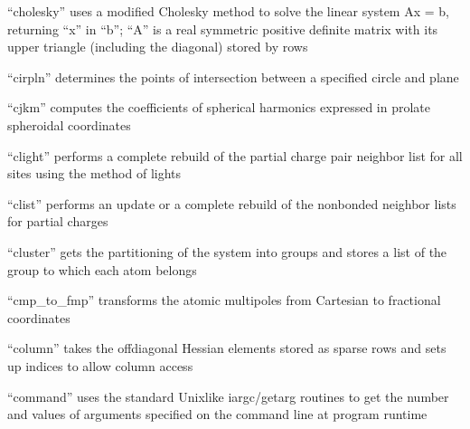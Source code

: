\documentclass[letterpaper,11pt,english]{sphinxmanual}
\begin{document}

“cholesky” uses a modified Cholesky method to solve the linear
system Ax = b, returning “x” in “b”; “A” is a real symmetric
positive definite matrix with its upper triangle (including the
diagonal) stored by rows


“cirpln” determines the points of intersection between a
specified circle and plane


“cjkm” computes the coefficients of spherical harmonics
expressed in prolate spheroidal coordinates


“clight” performs a complete rebuild of the partial charge
pair neighbor list for all sites using the method of lights







“clist” performs an update or a complete rebuild of the
nonbonded neighbor lists for partial charges


“cluster” gets the partitioning of the system into groups
and stores a list of the group to which each atom belongs


“cmp\_to\_fmp” transforms the atomic multipoles from Cartesian
to fractional coordinates


“column” takes the off\sphinxhyphen{}diagonal Hessian elements stored
as sparse rows and sets up indices to allow column access


“command” uses the standard Unix\sphinxhyphen{}like iargc/getarg routines
to get the number and values of arguments specified on the
command line at program runtime
\end{document}
